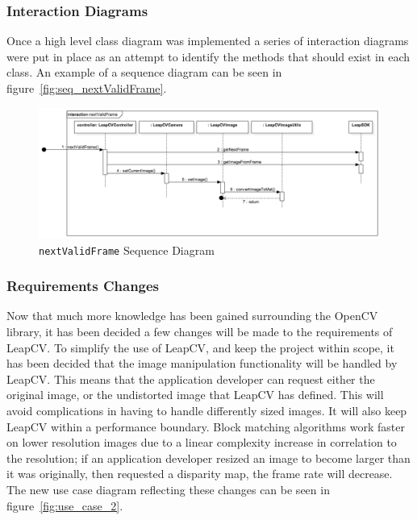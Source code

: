 \documentclass[11pt,oneside]{report}
\newcommand\code[1]{\texttt{#1}}
\begin{document}
		\subsubsection{Interaction Diagrams}
		Once a high level class diagram was implemented a series of interaction diagrams were put in place as an attempt to identify the methods that should exist in each class.
		An example of a sequence diagram can be seen in figure~\ref{fig:seq_nextValidFrame}.
		\begin{figure}
			\centering
    				\includegraphics[width=\textheight, angle=90]{seq_nextValidFrame}
    			\caption{\code{nextValidFrame} Sequence Diagram \protect {\label{fig:seq_nextValidFrame}}}
		\end{figure}	
		\subsubsection{Requirements Changes}
			Now that much more knowledge has been gained surrounding the OpenCV library, it has been decided a few changes will be made to the requirements of LeapCV.
			To simplify the use of LeapCV, and keep the project within scope, it has been decided that the image manipulation functionality will be handled by LeapCV.
			This means that the application developer can request either the original image, or the undistorted image that LeapCV has defined.
			This will avoid complications in having to handle differently sized images.
			It will also keep LeapCV within a performance boundary.
			Block matching algorithms work faster on lower resolution images due to a linear complexity increase in correlation to the resolution; if an application developer resized an image to become larger than it was originally, then requested a disparity map,  the frame rate will decrease.
			The new use case diagram reflecting these changes can be seen in figure~\ref{fig:use_case_2}.
			
\end{document}
